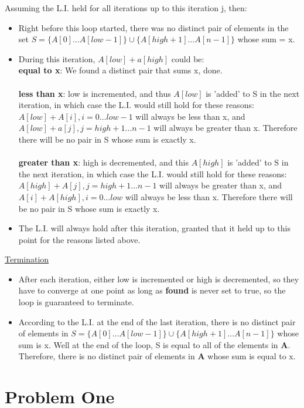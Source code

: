 \documentclass[a4paper,12pt]{article}
\begin{document}
\begin{indentpar}{1cm}
  Assuming the L.I. held for all iterations up to this iteration j, then:
  \begin{itemize}
    \item Right before this loop started, there was no distinct pair of elements in the set 
      \(S = \{A[0] \dots A[low-1]\} \cup \{A[high+1] \dots A[n-1]\}\) whose sum = x.
    \item During this iteration, \(A[low] + a[high]\) could be:\\
      {\bf equal to x}: We found a distinct pair that sums x, done.\\\\
      {\bf less than x}: low is incremented, and thus \(A[low]\) is 'added' to S in the next iteration, in which
      case the L.I. would still hold for these reasons: \(A[low] + A[i], i= 0 \dots low-1\) will always be less than
      x, and \(A[low] + a[j], j = high+1 \dots n-1\) will always be greater than x. Therefore there will be no pair in S
      whose sum is exactly x.\\\\
      {\bf greater than x}: high is decremented, and this \(A[high]\) is 'added' to S in the next iteration, in 
      which case the L.I. would still hold for these reasons: \(A[high] + A[j], j = high+1 \dots n-1\) will always
      be greater than x, and \(A[i] + A[high], i = 0 \dots low\) will always be less than x. Therefore there will be
      no pair in S whose sum is exactly x.
    \item The L.I. will always hold after this iteration, granted that it held up to this point for the reasons listed
      above.
  \end{itemize}
\underline{Termination}
\begin{indentpar}{1cm}
  \begin{itemize}
    \item After each iteration, either low is incremented or high is decremented, so they have to converge at one
      point as long as {\bf found} is never set to true, so the loop is guaranteed to terminate.
    \item According to the L.I. at the end of the last iteration, there is no distinct pair of elements in 
      \(S = \{A[0] \dots A[low-1] \} \cup \{A[high+1] \dots A[n-1]\}\) whose sum is x. Well at the end of the loop,
      S is equal to all of the elements in {\bf A}. Therefore, there is no distinct pair of elements in {\bf A} whose
      sum is equal to x.
  \end{itemize}
\end{indentpar}
\end{indentpar}
\section{Problem One}
\end{document}
